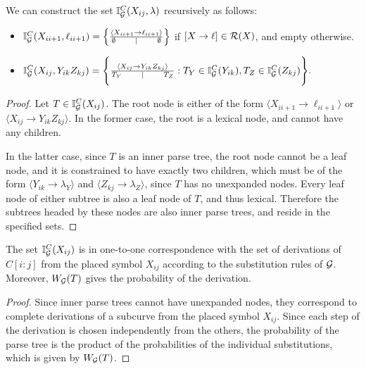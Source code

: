 \documentclass{article}
\newcommand\Inner{\mathbb{I}}
\begin{document}
\begin{prop}
\label{prop-induct-inside}
We can construct the set $\Inner_\GGG^C(X_{ij}, \lambda)$ recursively
as follows:
\begin{itemize}
\item $\Inner_\GGG^C(X_{i i+1}, \ell_{i i+1}) = \left\{ \frac{ \langle
      X_{i i+1} \to \ell_{i i+1} \rangle}{ \emptyset \qquad \mid
      \qquad \emptyset } \right\}$
if $[X\to \ell] \in {\mathcal R}(X)$, and empty otherwise.
\item 
$    \Inner_\GGG^C(X_{ij}, Y_{ik} Z_{kj}) = \Bigg\{ \frac{\langle
  X_{ij} \to Y_{ik}Z_{kj} \rangle}{ T_Y \qquad \mid \qquad T_Z} : 
 T_Y\in
      \Inner_\GGG^C(Y_{ik}), T_Z \in \Inner_\GGG^C(Z_{kj}) \Bigg\}.
$
\end{itemize}
\end{prop}
\begin{proof}
  Let $T\in \Inner_\GGG^C(X_{ij})$. The root node is either of the
  form $\langle X_{i i+1} \to \ell_{i i+1}\rangle$ or $\langle X_{i
    j}\to Y_{i k} Z_{k j}\rangle$. In the former case, the root is a lexical
  node, and cannot have any children.

  In the latter case, since $T$ is an inner parse tree, the root node
  cannot be a leaf node, and it is constrained to have exactly two
  children, which must be of the form $\langle Y_{ik}\to
  \lambda_Y\rangle$ and $\langle Z_{kj} \to \lambda_Z \rangle$, since
  $T$ has no unexpanded nodes. Every leaf node of either subtree is
  also a leaf node of $T$, and thus lexical. Therefore the subtrees
  headed by these nodes are also inner parse trees, and reside in the
  specified sets.
\end{proof}

\begin{prop}
\label{prop-inside-corr}
  The set $\Inner_\GGG^C(X_{ij})$ is in one-to-one correspondence with
  the set of derivations of $C[i:j]$ from the placed symbol $X_{ij}$
  according to the substitution rules of ${\mathcal G}$. Moreover, $W_{{\mathcal G}}(T)$
  gives the probability of the derivation.
\end{prop}
\begin{proof}
Since inner parse trees cannot have unexpanded nodes, they correspond
to complete derivations of a subcurve from the placed symbol
$X_{ij}$. Since each step of the derivation is chosen independently
from the others, the probability of the parse tree is the product of
the probabilities of the individual substitutions, which is given by $W_{{\mathcal G}}(T)$.
\end{proof}
\end{document}
